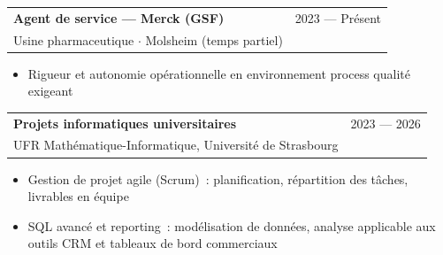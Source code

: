 \documentclass[10.5pt,a4paper]{article}
\makeatletter
\newcommand{\cventry}[4]{
    \noindent
    \begin{tabularx}{\linewidth}{@{}X r@{}}
        \textbf{\small #1} & {\footnotesize\color{graytext}#2} \\
        {\footnotesize\color{graytext}#3} & \\
    \end{tabularx}
    \vspace{1pt}
    #4
    \vspace{5pt}
}
\makeatother
\begin{document}
{\begin{minipage}[t][297mm][t]{0.62\textwidth}
\begin{minipage}[t]{0.88\linewidth}
\cventry{Agent de service — Merck (GSF)}{2023 — Pr\'esent}{Usine pharmaceutique $\cdot$ Molsheim (temps partiel)}{
\begin{itemize}
    \item Rigueur et autonomie op\'erationnelle en environnement process qualit\'e exigeant
\end{itemize}
}

\cventry{Projets informatiques universitaires}{2023 — 2026}{UFR Math\'ematique-Informatique, Universit\'e de Strasbourg}{
\begin{itemize}
    \item Gestion de projet agile (Scrum)~: planification, r\'epartition des t\^aches, livrables en \'equipe
    \item SQL avanc\'e et reporting~: mod\'elisation de donn\'ees, analyse applicable aux outils CRM et tableaux de bord commerciaux
\end{itemize}
}

\end{minipage}
\end{minipage}%
}
\end{document}
